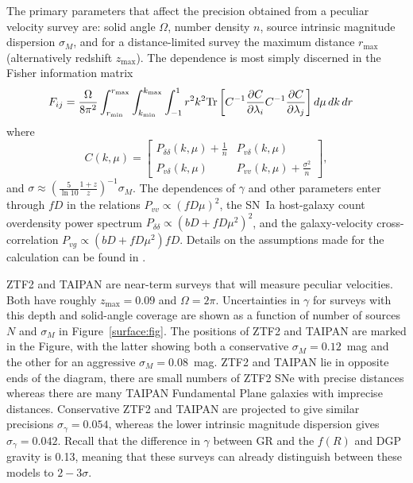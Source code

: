 \documentclass[11pt, oneside]{article}   	%
\begin{document}
The primary  parameters that affect the precision obtained from a peculiar velocity survey are: solid angle $\Omega$, number density $n$, source intrinsic
magnitude dispersion $\sigma_M$, and for a distance-limited survey the maximum distance $r_{\text{max}}$ (alternatively redshift $z_{\text{max}}$).
The dependence is most simply discerned 
in the  Fisher information matrix
\begin{align}
F_{ij} 
& = \frac{\Omega}{8\pi^2} \int_{r_{\rm min}}^{r_{\rm max}}  \int_{k_{\rm min}}^{k_{\rm max}}  \int_{-1}^{1} r^2 k^2 \text{Tr}\left[ C^{-1} \frac{\partial C}{\partial \lambda_i} C^{-1}
\frac{\partial C}{\partial \lambda_j} \right] d\mu\,dk\,dr
\label{fisher:eqn}
\end{align}
where
\begin{equation}
C(k,\mu)  =
  \begin{bmatrix}
   P_{\delta \delta}(k,\mu) + \frac{1}{n} &
   P_{v\delta}(k,\mu)  \\
   P_{v\delta}(k,\mu)  &
  P_{vv}(k,\mu) + \frac{\sigma^2}{n}
   \end{bmatrix},
\label{cov:eq}
\end{equation}
and $\sigma \approx (\frac{5}{\ln{10}} \frac{1+z}{z})^{-1} \sigma_M$.
The dependences of $\gamma$ and other parameters enter through $fD$ in the relations $P_{vv}\propto (fD\mu)^2$, the SN~Ia host-galaxy count overdensity
power spectrum $P_{\delta \delta }\propto (bD + fD\mu^2)^2$, and the galaxy-velocity cross-correlation $P_{vg}
\propto  (bD + fD\mu^2)fD$.  Details
on the assumptions made for the calculation can be found in \cite{2019BAAS...51c.140K}.

ZTF2 and TAIPAN are near-term surveys that will measure peculiar velocities.  Both have roughly
 $z_{\text{max}}=0.09$ and $\Omega = 2\pi$.
Uncertainties in $\gamma$ for surveys with this depth and solid-angle coverage 
are shown as a function of number of sources $N$ and $\sigma_M$ in Figure~\ref{surface:fig}. The positions of ZTF2 and TAIPAN are marked
in the Figure, with the latter showing both  a conservative $\sigma_M=0.12$~mag and the other for an aggressive $\sigma_M=0.08$~mag.
ZTF2 and TAIPAN lie in opposite ends of the diagram, there are small numbers of ZTF2 SNe with precise distances
whereas there are many TAIPAN Fundamental Plane galaxies with imprecise distances. 
Conservative ZTF2 and TAIPAN
are projected to give similar precisions $\sigma_ \gamma = 0.054$, whereas  the lower intrinsic magnitude dispersion  gives
$\sigma_ \gamma = 0.042$.  
Recall that the difference in $\gamma$  between GR and the $f(R)$ and DGP gravity is 0.13, meaning that these surveys
can already distinguish between these models to $2-3 \sigma$.
\end{document}
